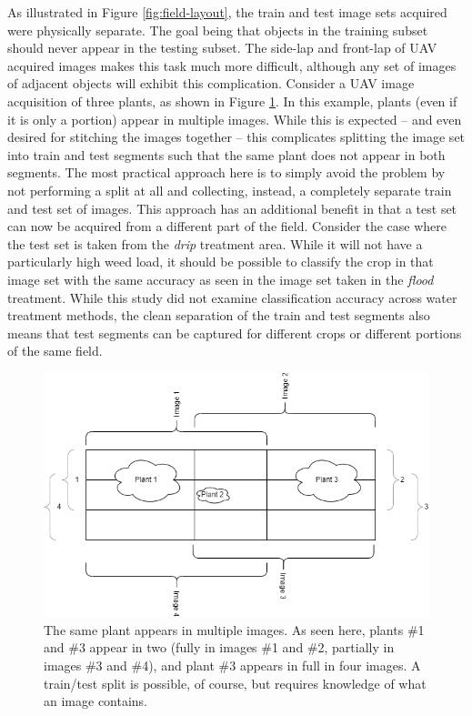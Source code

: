 \documentclass[letterpaper, notitlepage]{report}
\begin{document}
As illustrated in Figure \ref{fig:field-layout}, the train and test image sets acquired were physically separate. The goal being that objects in the training subset should never appear in the testing subset. The side-lap and front-lap of UAV acquired images makes this task much more difficult, although any set of images of adjacent objects will exhibit this complication. Consider a UAV image acquisition of three plants, as shown in Figure \ref{fig:uav-overlap}. In this example, plants (even if it is only a portion) appear in multiple images. While this is expected -- and even desired for stitching the images together -- this complicates splitting the image set into train and test segments such that the same plant does not appear in both segments. The most practical approach here is to simply avoid the problem by not performing a split at all and collecting, instead, a completely separate train and test set of images. This approach has an additional benefit in that a test set can now be acquired from a different part of the field. Consider the case where the test set is taken from the \textit{drip} treatment area. While it will not have a particularly high weed load, it should be possible to classify the crop in that image set with the same accuracy as seen in the image set taken in the \textit{flood} treatment. While this study did not examine classification accuracy across water treatment methods, the clean separation of the train and test segments also means that test segments can be captured for different crops or different portions of the same field.

\begin{figure}[h!]
	\centering
	\includegraphics[width=0.7\linewidth]{./figures/overlap.png}
	\caption[Image overlap in UAV images]{The same plant appears in multiple images. As seen here, plants \#1 and \#3 appear in two (fully in images \#1 and \#2, partially in images \#3 and \#4), and plant \#3 appears in full in four images. A train/test split is possible, of course, but requires knowledge of what an image contains.}
	\label{fig:uav-overlap}
\end{figure}
\end{document}
